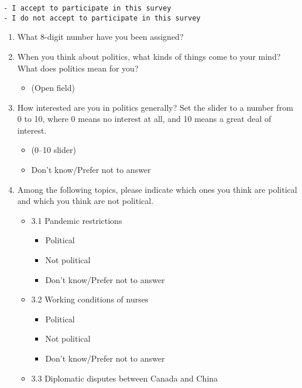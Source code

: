 \documentclass[
  letterpaper,
  DIV=11,
  numbers=noendperiod]{scrreprt}
\providecommand{\tightlist}{%
  \setlength{\itemsep}{0pt}\setlength{\parskip}{0pt}}\usepackage{longtable,booktabs,array}
\begin{document}
\begin{verbatim}
- I accept to participate in this survey
- I do not accept to participate in this survey
\end{verbatim}

\begin{enumerate}
\def\labelenumi{\arabic{enumi}.}
\setcounter{enumi}{-1}
\item
  What 8-digit number have you been assigned?
\item
  When you think about politics, what kinds of things come to your mind?
  What does politics mean for you?

  \begin{itemize}
  \tightlist
  \item
    (Open field)
  \end{itemize}
\item
  How interested are you in politics generally? Set the slider to a
  number from 0 to 10, where 0 means no interest at all, and 10 means a
  great deal of interest.

  \begin{itemize}
  \tightlist
  \item
    (0--10 slider)
  \item
    Don't know/Prefer not to answer
  \end{itemize}
\item
  Among the following topics, please indicate which ones you think are
  political and which you think are not political.

  \begin{itemize}
  \tightlist
  \item
    3.1 Pandemic restrictions

    \begin{itemize}
    \tightlist
    \item
      Political
    \item
      Not political
    \item
      Don't know/Prefer not to answer
    \end{itemize}
  \item
    3.2 Working conditions of nurses

    \begin{itemize}
    \tightlist
    \item
      Political
    \item
      Not political
    \item
      Don't know/Prefer not to answer
    \end{itemize}
  \item
    3.3 Diplomatic disputes between Canada and China


\end{itemize}
\end{enumerate}
\end{document}
